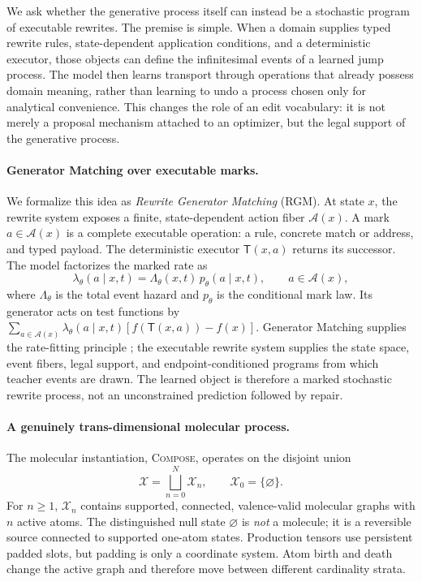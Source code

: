 \documentclass[10pt,letterpaper]{article}
\newcommand{\method}{\textsc{Compose}\xspace}
\newcommand{\rgm}{\textsc{RGM}\xspace}
\newcommand{\X}{\mathcal{X}}
\newcommand{\A}{\mathcal{A}}
\newcommand{\T}{\mathsf{T}}
\begin{document}
We ask whether the generative process itself can instead be a stochastic
program of executable rewrites. The premise is simple. When a domain supplies
typed rewrite rules, state-dependent application conditions, and a
deterministic executor, those objects can define the infinitesimal events of a
learned jump process. The model then learns transport through operations that
already possess domain meaning, rather than learning to undo a process chosen
only for analytical convenience. This changes the role of an edit vocabulary:
it is not merely a proposal mechanism attached to an optimizer, but the legal
support of the generative process.

\paragraph{Generator Matching over executable marks.}
We formalize this idea as \emph{Rewrite Generator Matching} (\rgm). At state
$x$, the rewrite system exposes a finite, state-dependent action fiber
$\A(x)$. A mark $a\in\A(x)$ is a complete executable operation: a rule,
concrete match or address, and typed payload. The deterministic executor
$\T(x,a)$ returns its successor. The model factorizes the marked rate as
\begin{equation}
  \lambda_\theta(a\mid x,t)
  =
  \Lambda_\theta(x,t)\,p_\theta(a\mid x,t),
  \qquad
  a\in\A(x),
\end{equation}
where $\Lambda_\theta$ is the total event hazard and $p_\theta$ is the
conditional mark law. Its generator acts on test functions by
$\sum_{a\in\A(x)}\lambda_\theta(a\mid x,t)
[f(\T(x,a))-f(x)]$. Generator Matching supplies the rate-fitting principle
\citep{holderrieth2025generator}; the executable rewrite system supplies the
state space, event fibers, legal support, and endpoint-conditioned programs
from which teacher events are drawn. The learned object is therefore a marked
stochastic rewrite process, not an unconstrained prediction followed by
repair.

\paragraph{A genuinely trans-dimensional molecular process.}
The molecular instantiation, \method, operates on the disjoint union
\[
  \X=\bigsqcup_{n=0}^{N}\X_n,
  \qquad
  \X_0=\{\varnothing\}.
\]
For $n\geq 1$, $\X_n$ contains supported, connected, valence-valid molecular
graphs with $n$ active atoms. The distinguished null state $\varnothing$ is
\emph{not} a molecule; it is a reversible source connected to supported
one-atom states. Production tensors use persistent padded slots, but padding is
only a coordinate system. Atom birth and death change the active graph and
therefore move between different cardinality strata.
\end{document}

